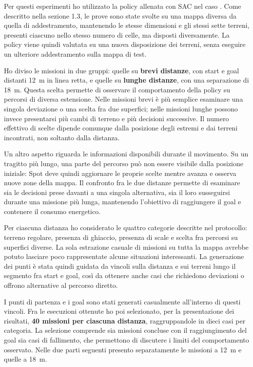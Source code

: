 \documentclass[11pt,a4paper]{article}
\begin{document}
Per questi esperimenti ho utilizzato la policy allenata con SAC nel caso . Come descritto nella sezione 1.3, le prove sono state svolte su una mappa diversa da quella di addestramento, mantenendo le stesse dimensioni e gli stessi sette terreni, presenti ciascuno nello stesso numero di celle, ma disposti diversamente. La policy viene quindi valutata su una nuova disposizione dei terreni, senza eseguire un ulteriore addestramento sulla mappa di test.

Ho diviso le missioni in due gruppi: quelle su \textbf{brevi distanze}, con start e goal distanti 12~m in linea retta, e quelle su \textbf{lunghe distanze}, con una separazione di 18~m. Questa scelta permette di osservare il comportamento della policy su percorsi di diversa estensione. Nelle missioni brevi è più semplice esaminare una singola deviazione o una scelta fra due superfici; nelle missioni lunghe possono invece presentarsi più cambi di terreno e più decisioni successive. Il numero effettivo di scelte dipende comunque dalla posizione degli estremi e dai terreni incontrati, non soltanto dalla distanza.

Un altro aspetto riguarda le informazioni disponibili durante il movimento. Su un tragitto più lungo, una parte del percorso può non essere visibile dalla posizione iniziale: Spot deve quindi aggiornare le proprie scelte mentre avanza e osserva nuove zone della mappa. Il confronto fra le due distanze permette di esaminare sia le decisioni prese davanti a una singola alternativa, sia il loro susseguirsi durante una missione più lunga, mantenendo l'obiettivo di raggiungere il goal e contenere il consumo energetico.

Per ciascuna distanza ho considerato le quattro categorie descritte nel protocollo: terreno regolare, presenza di ghiaccio, presenza di scale e scelta fra percorsi su superfici diverse. La sola estrazione casuale di missioni su tutta la mappa avrebbe potuto lasciare poco rappresentate alcune situazioni interessanti. La generazione dei punti è stata quindi guidata da vincoli sulla distanza e sui terreni lungo il segmento fra start e goal, così da ottenere anche casi che richiedono deviazioni o offrono alternative al percorso diretto.

I punti di partenza e i goal sono stati generati casualmente all'interno di questi vincoli. Fra le esecuzioni ottenute ho poi selezionato, per la presentazione dei risultati, \textbf{40 missioni per ciascuna distanza}, raggruppandole in dieci casi per categoria. La selezione comprende sia missioni concluse con il raggiungimento del goal sia casi di fallimento, che permettono di discutere i limiti del comportamento osservato. Nelle due parti seguenti presento separatamente le missioni a 12~m e quelle a 18~m.
\end{document}
